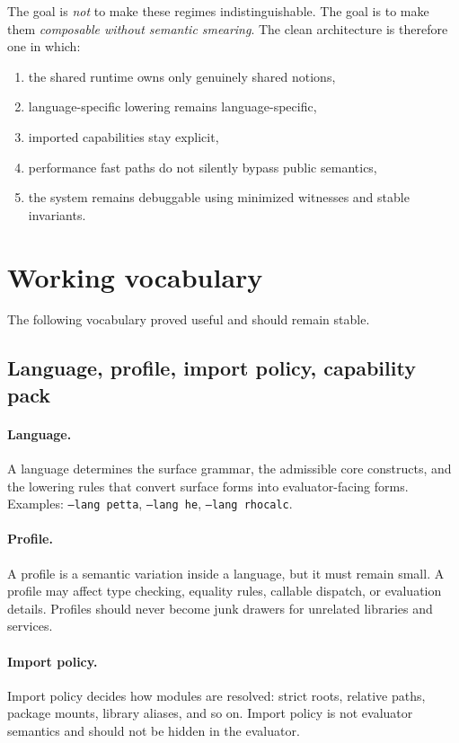 \documentclass[11pt]{article}
\begin{document}
The goal is \emph{not} to make these regimes indistinguishable. The goal is to make them \emph{composable without semantic smearing}. The clean architecture is therefore one in which:
\begin{enumerate}
    \item the shared runtime owns only genuinely shared notions,
    \item language-specific lowering remains language-specific,
    \item imported capabilities stay explicit,
    \item performance fast paths do not silently bypass public semantics,
    \item the system remains debuggable using minimized witnesses and stable invariants.
\end{enumerate}

\section{Working vocabulary}

The following vocabulary proved useful and should remain stable.

\subsection{Language, profile, import policy, capability pack}

\paragraph{Language.} A language determines the surface grammar, the admissible core constructs, and the lowering rules that convert surface forms into evaluator-facing forms. Examples: \texttt{--lang petta}, \texttt{--lang he}, \texttt{--lang rhocalc}.

\paragraph{Profile.} A profile is a semantic variation inside a language, but it must remain small. A profile may affect type checking, equality rules, callable dispatch, or evaluation details. Profiles should never become junk drawers for unrelated libraries and services.

\paragraph{Import policy.} Import policy decides how modules are resolved: strict roots, relative paths, package mounts, library aliases, and so on. Import policy is not evaluator semantics and should not be hidden in the evaluator.
\end{document}
